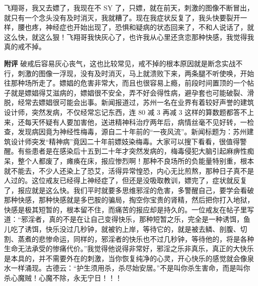 \begin{case}
    飞翔哥，我又去嫖了，我现在不 SY 了，只嫖，就在前天，刺激的图像不断冒出，就只有一个念头没有及时消灭，我就糟了。现在我症状反复了，我头快要裂开一样，腰也疼，神经症也开始出现了，恐惧和疑病的状态回来了，不和人说话了，就这么快，就这么狠！飞翔哥我快灰心了，也许我从心里还贪恋那种快感，我觉得我真的戒不掉。

    \textbf{附评} 破戒后容易灰心丧气，这也比较常见，戒不掉的根本原因就是断念实战不行，刺激的图像一浮现，没有及时消灭，马上就溃败下来，两条腿不听使唤，开始往那种场所走了。嫖娼的危害非常大，而且也很容易上瘾，前段时间置顶的一个帖子就是嫖娼得艾滋病的，嫖娼很不安全，弄不好会得性病，避孕套也可能破裂、滑脱，经常去嫖娼很可能会出事。新闻报道过，苏州一名在业界有着较好声誉的建筑设计师，突然发病，不仅经常忘记东西，连 80 减 3 再减 3 这样的算数题都答不上来，还每天怀疑有人要加害他，送进精神科治疗两年后，病情丝毫不见好转，一检查，发现病因竟为神经性梅毒，源自二十年前的“一夜风流”。新闻标题为：苏州建筑设计师突发“精神病”竟因二十年前嫖妓染梅毒。大家可以搜下看看，很值得警醒。有些患者是在感染后十五到二十年才突然发病的，梅毒侵犯大脑引起麻痹性痴呆，整个人都废了，瘫痪在床，报应惨烈啊！那种不良场所的负能量特别重，根本就不能去，不少人还染上了恐艾，活得异常惶恐，内心无比煎熬，那种日子真不是人过的。这位戒友已经得上神经症了，但还是没吸取教训，嫖完了，症状就反复了，报应就是这么快。我们平时就要多思维邪淫的危害，多警醒自己，要学会看破那种快感，那种快感就是多巴胺的骗局，掏空你宝贵的肾精，然后把你打入地狱，快感是极其短暂的，根本留不住，而痛苦的报应却是持久的。一位戒友在帖子里写道：“邪淫者，真的不是在让自己变得快乐，那种短暂之乐，完全是一种诱饵，鱼儿吃了诱饵，快乐没过几秒钟，就被钓上岸，等待它的，就是被去鳞、剖腹、切割、蒸煮的悲惨命运，同样的，邪淫者的快乐也不过几秒钟，等待他的，将是各种生命无法承受的惨痛代价。”我觉得他说得非常好，邪淫之乐非真乐，真正的大快乐是本具的，并不需要外在的刺激，当你恢复纯净的心灵，开心快乐的感觉就会像泉水一样涌现。古德云：“护生须用杀，杀尽始安居。”不是叫你杀生害命，而是叫你杀心魔贼！心魔不除，永无宁日！！！
\end{case}

